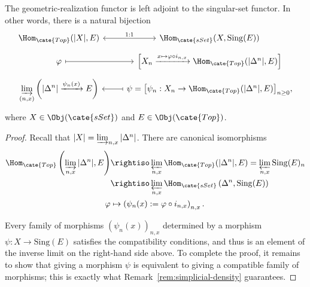 \begin{theorem}\label{prop:geom-Sing-adjunction}
	The geometric-realization functor is left adjoint to the singular-set
	functor. In other words, there is a natural bijection
	\[\begin{tikzcd}[row sep=tiny]
		\Hom_{\cate{Top}}(|X|, E) \arrow[leftrightarrow, r, "1:1"] & \Hom_{\cate{sSet}}(X, \mathrm{Sing}(E)) \\
		\varphi \arrow[mapsto, r] & {\left[ X_n \xrightarrow{x \mapsto \varphi \circ i_{n, x}} \Hom_{\cate{Top}}(|\Delta^n|, E) \right]} \\
		\displaystyle\varinjlim_{(n, x)} \left( |\Delta^n| \xrightarrow{\psi_n(x)} E \right) & \psi = {\left[ \psi_n: X_n \to \Hom_{\cate{Top}}(|\Delta^n|, E) \right]}_{n \geq 0} , \arrow[mapsto, l]
	\end{tikzcd}\]
	where $X\in\Obj(\cate{sSet})$ and $E\in\Obj(\cate{Top})$.
\end{theorem}
\begin{proof}
	Recall that $|X|=\varinjlim_{n,x}|\Delta^n|$. There are canonical
	isomorphisms
	\begin{align*}
		\Hom_{\cate{Top}}\left( \varinjlim_{n, x} |\Delta^n| , E \right) & \rightiso \varprojlim_{n, x} \Hom_{\cate{Top}}(|\Delta^n|, E) = \varprojlim_{n, x} \mathrm{Sing}(E)_n \\
		& \rightiso \varprojlim_{n, x} \Hom_{\cate{sSet}}\left( \Delta^n, \mathrm{Sing}(E) \right) \\
		\varphi & \mapsto \left( \psi_n(x) := \varphi \circ i_{n, x} \right)_{n, x}.
	\end{align*}

	Every family of morphisms $(\psi_n(x))_{n,x}$ determined by a morphism
	$\psi:X\to\mathrm{Sing}(E)$ satisfies the compatibility conditions, and
	thus is an element of the inverse limit on the right-hand side above. To
	complete the proof, it remains to show that giving a morphism $\psi$ is
	equivalent to giving a compatible family of morphisms; this is exactly what
	Remark~\ref{rem:simplicial-density} guarantees.
\end{proof}

